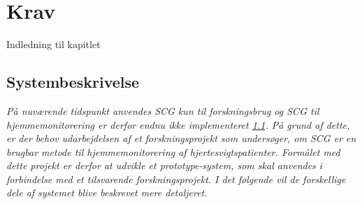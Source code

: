 \section{Krav}

Indledning til kapitlet

\subsection{Systembeskrivelse}

\textit{På nuværende tidspunkt anvendes SCG kun til forskningsbrug og SCG til hjemmemonitorering er derfor endnu ikke implementeret \ref{}. På grund af dette, er der behov udarbejdelsen af et forskningsprojekt som undersøger, om SCG er en brugbar metode til hjemmemonitorering af hjertesvigtspatienter. Formålet med dette projekt er derfor at udvikle et prototype-system, som skal anvendes i forbindelse med et tilsvarende forskningsprojekt. I det følgende vil de forskellige dele af systemet blive beskrevet mere detaljeret.}

